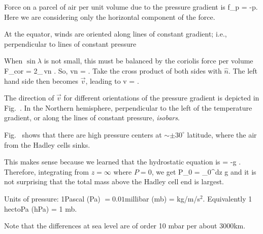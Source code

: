 \documentclass[11pt]{book}
\begin{document}
\bei
\item
Force on a parcel of air per unit volume due to the pressure gradient is
\be
\vec f_p = -\nabla p.\ee
Here we are considering only the horizontal component of the force. 
\item At the equator, winds are oriented along lines of constant gradient; i.e., perpendicular to lines of constant pressure
\item When $\sin\lambda$ is not small, this must be balanced by the coriolis force per volume
\be
\vec F_{cor} = 2\rho\omega_\Earth\sin\lambda\,\vec v\times \hat n
.\ee
So,
\be\vec v\times\hat n = 
.\ee
Take the cross product of both sides with $\hat n$. The left hand side then becomes $\vec v$, leading to
\be
\vec v = .\ee
\item 
The direction of $\vec v$ for different orientations of the pressure gradient is depicted in Fig.~. In the Northern hemisphere, perpendicular to the left of the temperature gradient, or along the lines of constant pressure, {\it isobars}.
\eei

\bei
\item
Fig.~ shows that there are high pressure centers at $\sim\pm30^\circ$ latitude, where the air from the Hadley cells sinks. 
\item This makes sense because we learned that the hydrostatic equation is
\be
{} = -\rho g
.\ee
Therefore, integrating from $z=\infty$ where $P=0$, we get
\be
P_0 = \int_0^\infty dz \rho g
\ee
and it is not surprising that the total mass above the Hadley cell end is largest.
\item Units of pressure: 1Pascal (Pa) $=0.01$millibar (mb) = kg/m/s$^2$. Equivalently 1 hectoPa  (hPa) = 1 mb.
\item Note that the differences at sea level are of order 10 mbar per about 3000km.
\eei
{}
\end{document}
